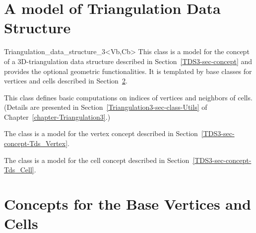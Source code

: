\section{A model of Triangulation Data Structure}
\label{TDS3-sec-class}

\begin{ccClassTemplate}{Triangulation_data_structure_3<Vb,Cb>}
This class is a model for the concept of a 3D-triangulation data structure
described in Section~\ref{TDS3-sec-concept} and provides the optional
geometric functionalities. It is templated by base classes for
vertices and cells described in Section~\ref{TDS3-sec-concept-Base}.


This class defines basic computations on indices of vertices and
neighbors of cells. (Details are presented in
Section~\ref{Triangulation3-sec-class-Utils} of
Chapter~\ref{chapter-Triangulation3}.)


The class  is a model for the vertex
concept described in Section~\ref{TDS3-sec-concept-Tds_Vertex}.


The class  is a model for the
cell concept described in Section~\ref{TDS3-sec-concept-Tds_Cell}.


	\end{ccClassTemplate} 

\section{Concepts for the Base Vertices and Cells}
\label{TDS3-sec-concept-Base}

